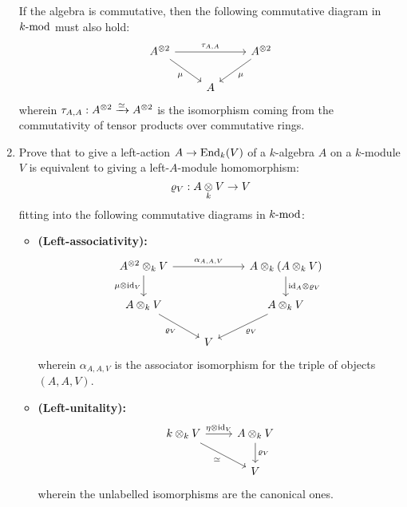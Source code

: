 \begin{question}
\begin{enumerate}
\begin{itemize}
                \end{itemize}
                If the algebra is commutative, then the following commutative diagram in $k\mod$ must also hold:
                    $$
                        \begin{tikzcd}
                    	{A^{\tensor 2}} && {A^{\tensor 2}} \\
                    	& A
                    	\arrow["{\tau_{A, A}}", from=1-1, to=1-3]
                    	\arrow["\mu"', from=1-1, to=2-2]
                    	\arrow["\mu", from=1-3, to=2-2]
                        \end{tikzcd}
                    $$
                wherein $\tau_{A, A}: A^{\tensor 2} \xrightarrow[]{\cong} A^{\tensor 2}$ is the isomorphism coming from the commutativity of tensor products over commutative rings.
                \item Prove that to give a left-action $A \to \End_k(V)$ of a $k$-algebra $A$ on a $k$-module $V$ is equivalent to giving a left-$A$-module homomorphism:
                    $$\varrho_V: A \tensor_k V \to V$$
                fitting into the following commutative diagrams in $k\mod$:
                \begin{itemize}
                    \item \textbf{(Left-associativity):}
                        $$
                            \begin{tikzcd}
                        	{A^{\tensor 2} \tensor_k V} && {A \tensor_k (A \tensor_k V)} \\
                        	{A \tensor_k V} && {A \tensor_k V} \\
                        	& V
                        	\arrow["{\alpha_{A, A, V}}", from=1-1, to=1-3]
                        	\arrow["{\mu \tensor \id_V}"', from=1-1, to=2-1]
                        	\arrow["{\id_A \tensor \varrho_V}", from=1-3, to=2-3]
                        	\arrow["{\varrho_V}"', from=2-1, to=3-2]
                        	\arrow["{\varrho_V}", from=2-3, to=3-2]
                            \end{tikzcd}
                        $$
                    wherein $\alpha_{A, A, V}$ is the associator isomorphism for the triple of objects $(A, A, V)$.
                    \item \textbf{(Left-unitality):}
                        $$
                            \begin{tikzcd}
                        	{k \tensor_k V} & {A \tensor_k V} \\
                        	& V
                        	\arrow["{\eta \tensor \id_V}", from=1-1, to=1-2]
                        	\arrow["\cong"', from=1-1, to=2-2]
                        	\arrow["{\varrho_V}", from=1-2, to=2-2]
                            \end{tikzcd}
                        $$
                    wherein the unlabelled isomorphisms are the canonical ones.
                \end{itemize}
                    

\end{enumerate}
\end{question}
